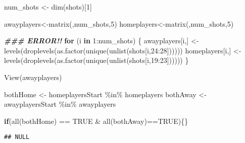 \documentclass[
]{article}
\newenvironment{Shaded}{\begin{snugshade}}{\end{snugshade}}
\newcommand{\ConstantTok}[1]{\textcolor[rgb]{0.00,0.00,0.00}{#1}}
\newcommand{\ControlFlowTok}[1]{\textcolor[rgb]{0.13,0.29,0.53}{\textbf{#1}}}
\newcommand{\DecValTok}[1]{\textcolor[rgb]{0.00,0.00,0.81}{#1}}
\newcommand{\DocumentationTok}[1]{\textcolor[rgb]{0.56,0.35,0.01}{\textbf{\textit{#1}}}}
\newcommand{\FunctionTok}[1]{\textcolor[rgb]{0.00,0.00,0.00}{#1}}
\newcommand{\NormalTok}[1]{#1}
\newcommand{\OtherTok}[1]{\textcolor[rgb]{0.56,0.35,0.01}{#1}}
\newcommand{\SpecialCharTok}[1]{\textcolor[rgb]{0.00,0.00,0.00}{#1}}
\begin{document}
\begin{Shaded}
\begin{Highlighting}[]
\NormalTok{num\_shots }\OtherTok{\textless{}{-}} \FunctionTok{dim}\NormalTok{(shots)[}\DecValTok{1}\NormalTok{]}

\NormalTok{awayplayers}\OtherTok{\textless{}{-}}\FunctionTok{matrix}\NormalTok{(,num\_shots,}\DecValTok{5}\NormalTok{)}
\NormalTok{homeplayers}\OtherTok{\textless{}{-}}\FunctionTok{matrix}\NormalTok{(,num\_shots,}\DecValTok{5}\NormalTok{)}

\DocumentationTok{\#\#\# ERROR!!}
\ControlFlowTok{for}\NormalTok{ (i }\ControlFlowTok{in} \DecValTok{1}\SpecialCharTok{:}\NormalTok{num\_shots) \{}
\NormalTok{  awayplayers[i,] }\OtherTok{\textless{}{-}} \FunctionTok{levels}\NormalTok{(}\FunctionTok{droplevels}\NormalTok{(}\FunctionTok{as.factor}\NormalTok{(}\FunctionTok{unique}\NormalTok{(}\FunctionTok{unlist}\NormalTok{(shots[i,}\DecValTok{24}\SpecialCharTok{:}\DecValTok{28}\NormalTok{])))))}
\NormalTok{  homeplayers[i,] }\OtherTok{\textless{}{-}} \FunctionTok{levels}\NormalTok{(}\FunctionTok{droplevels}\NormalTok{(}\FunctionTok{as.factor}\NormalTok{(}\FunctionTok{unique}\NormalTok{(}\FunctionTok{unlist}\NormalTok{(shots[i,}\DecValTok{19}\SpecialCharTok{:}\DecValTok{23}\NormalTok{])))))}
\NormalTok{\}}

\FunctionTok{View}\NormalTok{(awayplayers)}

\NormalTok{bothHome }\OtherTok{\textless{}{-}}\NormalTok{ homeplayersStart }\SpecialCharTok{\%in\%}\NormalTok{ homeplayers}
\NormalTok{bothAway }\OtherTok{\textless{}{-}}\NormalTok{ awayplayersStart }\SpecialCharTok{\%in\%}\NormalTok{ awayplayers}

\ControlFlowTok{if}\NormalTok{(}\FunctionTok{all}\NormalTok{(bothHome) }\SpecialCharTok{==} \ConstantTok{TRUE} \SpecialCharTok{\&} \FunctionTok{all}\NormalTok{(bothAway)}\SpecialCharTok{==}\ConstantTok{TRUE}\NormalTok{)\{\}}
\end{Highlighting}
\end{Shaded}

\begin{verbatim}
## NULL
\end{verbatim}
\end{document}
